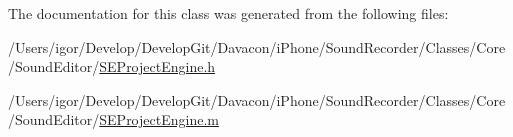 The documentation for this class was generated from the following files\-:\begin{DoxyCompactItemize}
\item 
/\-Users/igor/\-Develop/\-Develop\-Git/\-Davacon/i\-Phone/\-Sound\-Recorder/\-Classes/\-Core/\-Sound\-Editor/\hyperlink{_s_e_project_engine_8h}{S\-E\-Project\-Engine.\-h}\item 
/\-Users/igor/\-Develop/\-Develop\-Git/\-Davacon/i\-Phone/\-Sound\-Recorder/\-Classes/\-Core/\-Sound\-Editor/\hyperlink{_s_e_project_engine_8m}{S\-E\-Project\-Engine.\-m}\end{DoxyCompactItemize}
